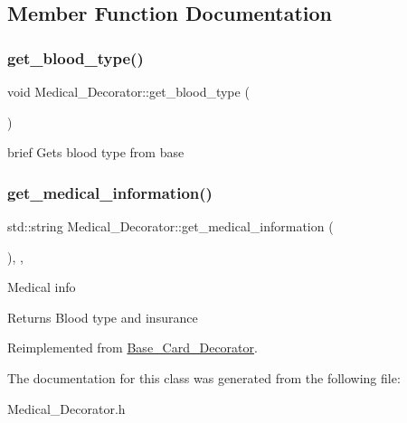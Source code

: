 \subsection{Member Function Documentation}
\mbox{\label{classMedical__Decorator_a795110d53121358fcb3d34a187379350}} 
\subsubsection{\texorpdfstring{get\+\_\+blood\+\_\+type()}{get\_blood\_type()}}
{\footnotesize\ttfamily void Medical\+\_\+\+Decorator\+::get\+\_\+blood\+\_\+type (\begin{DoxyParamCaption}{ }\end{DoxyParamCaption})\hspace{0.3cm}{\ttfamily [inline]}}

brief Gets blood type from base \mbox{\label{classMedical__Decorator_afde55c4f0f98d5ea566b5a989e631878}} 
\subsubsection{\texorpdfstring{get\+\_\+medical\+\_\+information()}{get\_medical\_information()}}
{\footnotesize\ttfamily std\+::string Medical\+\_\+\+Decorator\+::get\+\_\+medical\+\_\+information (\begin{DoxyParamCaption}{ }\end{DoxyParamCaption})\hspace{0.3cm}{\ttfamily [inline]}, {\ttfamily [override]}, {\ttfamily [virtual]}}

Medical info \begin{DoxyReturn}{Returns}
Blood type and insurance 
\end{DoxyReturn}


Reimplemented from \mbox{\hyperlink{classBase__Card__Decorator}{Base\+\_\+\+Card\+\_\+\+Decorator}}.



The documentation for this class was generated from the following file\+:\begin{DoxyCompactItemize}
\item 
Medical\+\_\+\+Decorator.\+h\end{DoxyCompactItemize}
